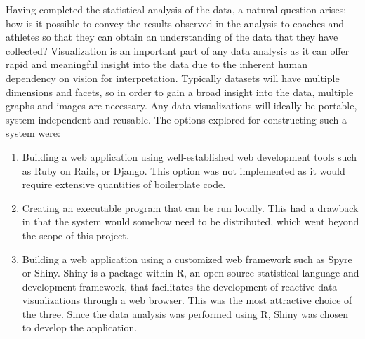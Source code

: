 Having completed the statistical analysis of the data, a natural question arises: how is it possible to convey the results observed in the analysis to coaches and athletes so that they can obtain an understanding of the data that they have collected? Visualization is an important part of any data analysis as it can offer rapid and meaningful insight into the data due to the inherent human dependency on vision for interpretation. Typically datasets will have multiple dimensions and facets, so in order to gain a broad insight into the data, multiple graphs and images are necessary. Any data visualizations will ideally be portable, system independent and reusable. The options explored for constructing such a system were:
\begin{enumerate}
	\item Building a web application using well-established web development tools such as Ruby on Rails, or Django. This option was not implemented as it would require extensive quantities of boilerplate code.
	\item Creating an executable program that can be run locally. This had a drawback in that the system would somehow need to be distributed, which went beyond the scope of this project.
	\item Building a web application using a customized web framework such as Spyre or Shiny. Shiny is a package within R, an open source statistical language and development framework, that facilitates the development of reactive data visualizations through a web browser. This was the most attractive choice of the three. Since the data analysis was performed using R, Shiny was chosen to develop the application.
\end{enumerate}

